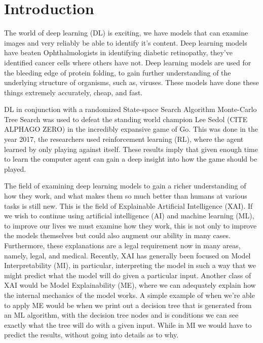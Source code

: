 \chapter{Introduction\label{cha:introduction}}

The world of deep learning (DL) is exciting, we have models that can examine
images and very reliably be able to identify it's content. Deep learning models have
beaten Ophthalmologists in identifying diabetic retinopathy, they've identified
cancer cells where others have not. Deep learning models are used for the bleeding
edge of protein folding, to gain further understanding of the underlying structure of organisms, such as, viruses. \cite{deepmind:alphafold}
These models have done these things extremely accurately, cheap, and fast.

DL in conjunction with a randomized State-space Search Algorithm Monte-Carlo Tree Search was used to defeat the standing world champion Lee Sedol (CITE ALPHAGO ZERO) in the incredibly expansive game of Go. This was done in the year 2017, the researchers used reinforcement learning (RL), where the agent learned by only playing against itself.
These results imply that given enough time to learn the computer agent can gain a deep insight into how the game should be played.

The field of examining deep learning models to gain a richer understanding
of how they work, and what makes them so much better than humans at various tasks
is still new. This is the field of Explainable Artificial Intelligence (XAI).
If we wish to continue using artificial intelligence (AI) and machine learning (ML),
to improve our lives we must examine how they work, this is not only to improve
the models themselves but could also augment our ability in many cases.
Furthermore, these explanations are a legal requirement now in many areas\cite{legalexplanation:goodman}, namely, legal, and
medical. Recently, XAI has generally been focused on Model Interpretability (MI), in
particular, interpreting the model in such a way that we might predict what the model will
do given a particular input. Another class of XAI would be Model Explainability (ME), where we can adequately explain how the internal mechanics of the model works.
A simple example of when we're able to apply ME would be when we print out a decision tree
that is generated from an ML algorithm, with the decision tree nodes and is conditions we can see exactly what the tree will do with a given input. While in MI we would have to predict the results, without going into details as to why.

